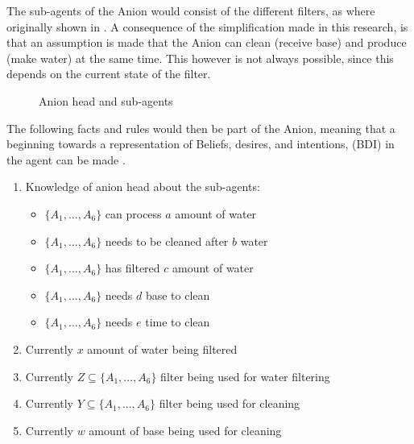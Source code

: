 The sub-agents of the Anion would consist of the different filters, as where originally shown in . A consequence of the simplification made in this research, is that an assumption is made that the Anion can clean (receive base) and produce (make water) at the same time. This however is not always possible, since this depends on the current state of the filter. 
\begin{figure}[h]
	
	\centering
	\caption{Anion head and sub-agents}
	\label{fig:anion-head-sub}
	
\end{figure}

The following facts and rules would then be part of the Anion, meaning that a beginning towards a representation of Beliefs, desires, and intentions, (BDI) in the agent can be made \citep{rao1995bdi}.

\begin{enumerate}
	\item
	Knowledge of anion head about the sub-agents:
	\begin{itemize}
		\item {$\{A_1, ..., A_6\}$ can process $a$ amount of water}
		\item {$\{A_1, ..., A_6\}$ needs to be cleaned after $b$ water}
		\item {$\{A_1, ..., A_6\}$ has filtered $c$ amount of water}
		\item {$\{A_1, ..., A_6\}$ needs $d$ base to clean}
		\item {$\{A_1, ..., A_6\}$ needs $e$ time to clean}
	\end{itemize}
	\item
	Currently $x$ amount of water being filtered 
	\item
	Currently $Z \subseteq \{A_1, ..., A_6\}$ filter being used for water filtering
	\item
	Currently $Y \subseteq \{A_1, ..., A_6\}$ filter being used for cleaning
	\item
	Currently $w$ amount of base being used for cleaning
\end{enumerate}


